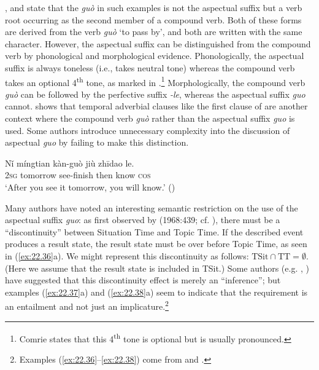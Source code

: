 \citet[251]{Chao1968}, \citet[59]{Comrie1976} and \citet[139ff.]{XiaoMcEnery2004} state that the \textit{guò} in such examples is not the aspectual suffix but a verb root occurring as the second member of a compound verb. Both of these forms are derived from the verb \textit{guò} ‘to pass by’, and both are written with the same  character. However, the aspectual suffix can be distinguished from the compound verb by phonological and morphological evidence. Phonologically, the aspectual suffix is always toneless (i.e., takes neutral tone) whereas the compound verb takes an optional 4\textsuperscript{th} tone, as marked in .\footnote{Comrie states that this 4\textsuperscript{th} tone is optional but is usually pronounced.} Morphologically, the compound verb \textit{guò} can be followed by the perfective suffix \textit{-le}, whereas the aspectual suffix \textit{guo} cannot. \citet[39--40]{Chu1998} shows that temporal adverbial clauses like the first clause of  are another context where the compound verb \textit{guò} rather than the aspectual suffix \textit{guo} is used. Some authors introduce unnecessary complexity into the discussion of aspectual \textit{guo} by failing to make this distinction.


\ea \label{ex:22.35}
\gll Nǐ  míngtian  kàn-guò  jiù  zhīdao  le.\\
\textsc{2sg}  tomorrow  see-finish  then  know  \textsc{cos}\\
\glt ‘After you see it tomorrow, you will know.’  (\citealt{Chen1979})
\z


Many authors have noted an interesting semantic restriction on the use of the aspectual suffix \textit{guo}: as first observed by \citeauthor{Chao1968} (1968:439; cf. \citealt{Yeh1996}), there must be a “discontinuity” between Situation Time and Topic Time. If the described event produces a result state, the result state must be over before Topic Time, as seen in (\ref{ex:22.36}a). We might represent this discontinuity as follows: $\text{TSit} \cap \text{TT}= ∅$. (Here we assume that the result state is included in TSit.) Some authors (e.g. \citealt{Iljic1990}, \citealt{Yeh1996}) have suggested that this discontinuity effect is merely an “inference”; but examples (\ref{ex:22.37}a) and (\ref{ex:22.38}a) seem to indicate that the requirement is an entailment and not just an implicature.\footnote{Examples (\ref{ex:22.36}--\ref{ex:22.38}) come from \citet[18, 25]{Ma1977} and \citet{Chao1968}.}


